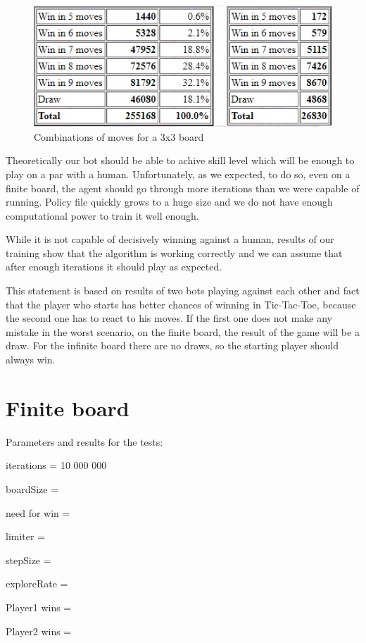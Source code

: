 \documentclass[a4paper,12pt]{book}
\begin{document}
\begin{figure}[!h]
\includegraphics{./Images/3x3moves.jpg}
	\centering
	\caption{Combinations of moves for a 3x3 board\protect\footnotemark}
	\label{fig:Capture1}
\end{figure}

Theoretically our bot should be able to achive skill level which will be enough to play on a par with a human. Unfortunately, as we expected, to do so, even on a finite board, the agent should go through more iterations than we were capable of running. Policy file quickly grows to a huge size and we do not have enough computational power to train it well enough.

While it is not capable of decisively winning against a human, results of our training show that the algorithm is working correctly and we can assume that after enough iterations it should play as expected. 

This statement is based on results of two bots playing against each other and fact that the player who starts has better chances of winning in Tic-Tac-Toe, because the second one has to react to his moves. If the first one does not make any mistake in the worst scenario, on the finite board, the result of the game will be a draw. For the infinite board there are no draws, so the starting player should always win.

 	\section{Finite board}

Parameters and results for the tests:

\begin{description}
	\item iterations = 10 000 000
	\item boardSize = 
	\item need for win = 
	\item limiter = 
	\item stepSize = 
	\item exploreRate = 
	\item Player1 wins = 
	\item Player2 wins = 
\end{description}
\end{document}
